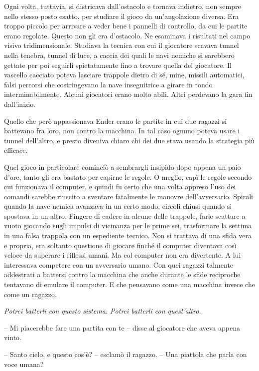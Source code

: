 {Ogni volta, tuttavia, si districava dall'ostacolo e tornava indietro,
	non sempre nello stesso posto esatto, per studiare il gioco da
	un'angolazione diversa. Era troppo piccolo per arrivare a veder bene i
	pannelli di controllo, da cui le partite erano regolate. Questo non gli
	era d'ostacolo. Ne esaminava i risultati nel campo visivo
	tridimensionale. Studiava la tecnica con cui il giocatore scavava tunnel
	nella tenebra, tunnel di luce, a caccia dei quali le navi nemiche si
	sarebbero gettate per poi seguirli spietatamente fino a trovare quella
	del giocatore. Il vascello cacciato poteva lasciare trappole dietro di
	sé, mine, missili automatici, falsi percorsi che costringevano la nave
	inseguitrice a girare in tondo interminabilmente. Alcuni giocatori erano
	molto abili. Altri perdevano la gara fin dall'inizio.}

{Quello che però appassionava Ender erano le partite in cui due ragazzi
	si battevano fra loro, non contro la macchina. In tal caso ognuno poteva
	usare i tunnel dell'altro, e presto diveniva chiaro chi dei due stava
	usando la strategia più efficace.}

{Quel gioco in particolare cominciò a sembrargli insipido dopo appena un
	paio d'ore, tanto gli era bastato per capirne le regole. O meglio, capì
	le regole secondo cui funzionava il computer, e quindi fu certo che una
	volta appreso l'uso dei comandi sarebbe riuscito a sventare fatalmente
	le manovre dell'avversario. Spirali quando la nave nemica avanzava in un
	certo modo, circoli chiusi quando si spostava in un altro. Fingere di
	cadere in alcune delle trappole, farle scattare a vuoto giocando sugli
	impulsi di vicinanza per le prime sei, trasformare la settima in una
	falsa trappola con un espediente tecnico. Non si trattava di una sfida
	vera e propria, era soltanto questione di giocare finché il computer
	diventava così veloce da superare i riflessi umani. Ma col computer non
	era divertente. A lui interessava competere con un avversario umano. Con
	quei ragazzi talmente addestrati a battersi contro la macchina che anche
	durante le sfide reciproche tentavano di emulare il computer. E che
	pensavano come una macchina invece che come un ragazzo.}

\emph{{Potrei batterli con questo sistema. Potrei batterli con
		quest'altro.}}

{-- Mi piacerebbe fare una partita con te -- disse al giocatore che
	aveva appena vinto.}

{-- Santo cielo, e questo cos'è? -- esclamò il ragazzo. -- Una piattola
	che parla con voce umana?}

